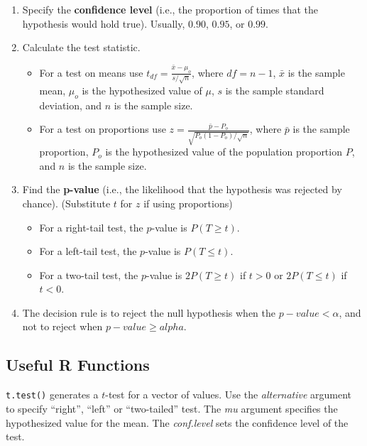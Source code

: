 \documentclass[
  letterpaper,
  DIV=11,
  numbers=noendperiod]{scrreprt}
\begin{document}
\begin{enumerate}
\def\labelenumi{\arabic{enumi}.}
\setcounter{enumi}{1}
\item
  Specify the \textbf{confidence level} (i.e., the proportion of times
  that the hypothesis would hold true). Usually, \(0.90\), \(0.95\), or
  \(0.99\).
\item
  Calculate the test statistic.

  \begin{itemize}
  \item
    For a test on means use
    \(t_{df}= \frac {\bar x-\mu_o}{s/\sqrt{n}}\), where \(df=n-1\),
    \(\bar x\) is the sample mean, \(\mu_o\) is the hypothesized value
    of \(\mu\), \(s\) is the sample standard deviation, and \(n\) is the
    sample size.
  \item
    For a test on proportions use
    \(z= \frac {\bar p- P_o}{\sqrt {P_o(1-P_o)/ \sqrt{n}}}\), where
    \(\bar p\) is the sample proportion, \(P_o\) is the hypothesized
    value of the population proportion \(P\), and \(n\) is the sample
    size.
  \end{itemize}
\item
  Find the \textbf{p-value} (i.e., the likelihood that the hypothesis
  was rejected by chance). (Substitute \(t\) for \(z\) if using
  proportions)

  \begin{itemize}
  \item
    For a right-tail test, the \(p\)-value is \(P(T\geq t)\).
  \item
    For a left-tail test, the \(p\)-value is \(P(T\leq t)\).
  \item
    For a two-tail test, the \(p\)-value is \(2P(T\geq t)\) if \(t>0\)
    or \(2P(T\leq t)\) if \(t<0\).
  \end{itemize}
\item
  The decision rule is to reject the null hypothesis when the
  \(p-value<\alpha\), and not to reject when \(p-value \geq alpha\).
\end{enumerate}

\hypertarget{useful-r-functions-12}{%
\subsection*{Useful R Functions}\label{useful-r-functions-12}}

\texttt{t.test()} generates a \(t\)-test for a vector of values. Use the
\emph{alternative} argument to specify ``right'', ``left'' or
``two-tailed'' test. The \emph{mu} argument specifies the hypothesized
value for the mean. The \emph{conf.level} sets the confidence level of
the test.
\end{document}
